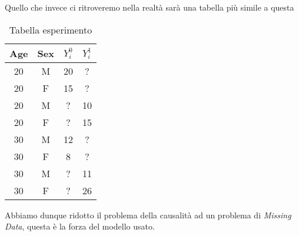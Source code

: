 Quello che invece ci ritroveremo nella realtà sarà una tabella più simile a questa 
\begin{table}[H]
\centering
\begin{tabular}{|c|c|c|c|}
\hline
Age & Sex & $Y^{0}_i$ & $Y^{1}_i$ \\ \hline
20 & M & 20 & ?  \\ \hline
20 & F & 15 & ? \\ \hline
20 & M & ? & 10 \\ \hline
20 & F & ? & 15  \\ \hline
30 & M & 12 & ? \\ \hline
30 & F & 8 & ? \\ \hline
30 & M & ? & 11   \\ \hline
30 & F & ? & 26 \\ \hline
\end{tabular}
\caption{Tabella esperimento }
\end{table}
Abbiamo dunque ridotto il problema della causalità ad un problema di \textit{Missing Data}, questa è la forza del modello usato.

